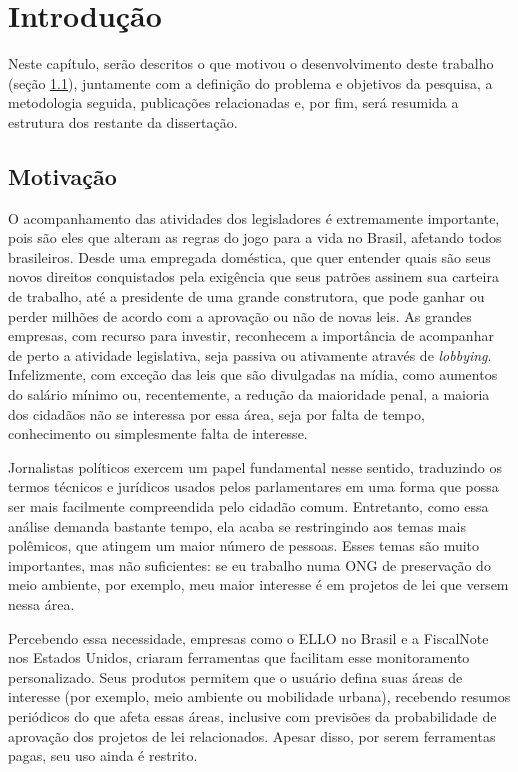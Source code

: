 \chapter{Introdução} \label{intro}

Neste capítulo, serão descritos o que motivou o desenvolvimento deste trabalho
(seção \ref{sec:motivacao}), juntamente com a definição do problema e objetivos
da pesquisa, a metodologia seguida, publicações relacionadas e, por fim, será
resumida a estrutura dos restante da dissertação.

\section{Motivação}\label{sec:motivacao}

O acompanhamento das atividades dos legisladores é extremamente importante,
pois são eles que alteram as regras do jogo para a vida no Brasil, afetando
todos brasileiros. Desde uma empregada doméstica, que quer entender quais são
seus novos direitos conquistados pela exigência que seus patrões assinem sua
carteira de trabalho, até a presidente de uma grande construtora, que pode
ganhar ou perder milhões de acordo com a aprovação ou não de novas leis. As grandes
empresas, com recurso para investir, reconhecem a importância de acompanhar de
perto a atividade legislativa, seja passiva ou ativamente através de
\emph{lobbying}. Infelizmente, com exceção das leis que são divulgadas na mídia,
como aumentos do salário mínimo ou, recentemente, a redução da maioridade
penal, a maioria dos cidadãos não se interessa por essa área, seja por falta de
tempo, conhecimento ou simplesmente falta de interesse.

Jornalistas políticos exercem um papel fundamental nesse sentido, traduzindo os
termos técnicos e jurídicos usados pelos parlamentares em uma forma que possa
ser mais facilmente compreendida pelo cidadão comum. Entretanto, como essa
análise demanda bastante tempo, ela acaba se restringindo aos temas mais
polêmicos, que atingem um maior número de pessoas. Esses temas são muito
importantes, mas não suficientes: se eu trabalho numa ONG de preservação do
meio ambiente, por exemplo, meu maior interesse é em projetos de lei que versem
nessa área.

Percebendo essa necessidade, empresas como o \gls{ELLO} no Brasil e a
FiscalNote nos Estados Unidos, criaram ferramentas que facilitam esse
monitoramento personalizado. Seus produtos permitem que o usuário defina suas
áreas de interesse (por exemplo, meio ambiente ou mobilidade urbana),
recebendo resumos periódicos do que afeta essas áreas, inclusive com previsões
da probabilidade de aprovação dos projetos de lei relacionados. Apesar disso,
por serem ferramentas pagas, seu uso ainda é restrito.


